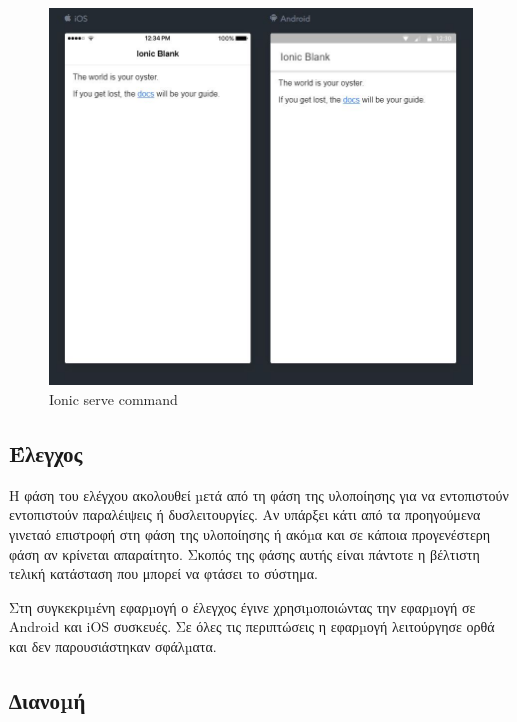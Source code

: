 \documentclass[a4paper,12pt]{article}
\begin{document}
				\begin{figure}[!htb]
					\begin{center}
						\caption{Ionic serve command}
						\vspace*{0.5cm}
						\includegraphics[width=\linewidth]{ionicServe} 
					\end{center}
				\end{figure}

		\newpage
		\subsection{Έλεγχος}

		Η φάση του ελέγχου ακολουθεί µετά από τη φάση της υλοποίησης για να εντοπιστούν
		εντοπιστούν παραλέιψεις ή δυσλειτουργίες. Αν υπάρξει κάτι από τα προηγούμενα  γινεταό επιστροφή στη φάση της υλοποίησης
		ή ακόµα και σε κάποια προγενέστερη φάση αν κρίνεται απαραίτητο. Σκοπός της φάσης αυτής είναι
		πάντοτε η βέλτιστη τελική κατάσταση που μπορεί να φτάσει το σύστημα.

		Στη συγκεκριµένη εφαρµογή ο έλεγχος έγινε χρησιµοποιώντας την
		εφαρµογή σε Android και iOS συσκευές. Σε όλες τις
		περιπτώσεις η εφαρµογή λειτούργησε ορθά και δεν παρουσιάστηκαν σφάλµατα.
		
		\subsection{∆ιανοµή}
\end{document}
